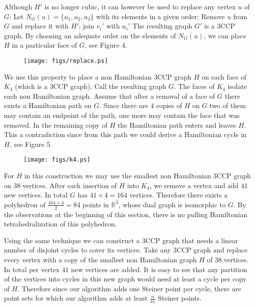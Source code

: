 \documentclass{article}
\begin{document}
Although $H'$ is no longer cubic, it can however be used to replace any vertex $u$ of $G$:
Let $N_G(u)=\{u_1, u_2, u_3\}$ with its elements in a given order; Remove $u$ from $G$ and replace it with $H'$;
join $v_i'$ with  $u_i'$
The resulting graph $G'$ is a $3$CCP graph. By choosing an adequate order on the elements of $N_G(u)$, we can place $H$ in a particular face of $G$, see Figure 4. \par

\begin{figure}\label{fig:choice}
	\begin{center}
  		\texttt{[image: figs/replace.ps]}
	\end{center}
	\caption{}
\end{figure}

We use this property to place a non Hamiltonian $3$CCP graph $H$ on each face of $K_4$ (which is
a $3$CCP graph). Call the resulting graph $G$.
The faces of $K_4$ isolate each non Hamiltonian graph. 
Assume that after a removal of a face of $G$ there exists a Hamiltonian path on $G$. 
Since there are $4$ copies of $H$ on $G$
two of them may contain an endpoint of the path, one more may contain the face that was removed.
In the remaining copy of $H$ the Hamiltonian path enters and leaves $H$. This a contradiction 
since from this path we could derive a Hamiltonian cycle in $H$, see Figure 5.\par

\begin{figure}\label{fig:k4}
	\begin{center}
  		\texttt{[image: figs/k4.ps]}
	\end{center}
	\caption{}
\end{figure}


For $H$ in this construction we may use the smallest non Hamiltonian $3$CCP graph on $38$ vertices.
After each insertion of $H$ into $K_4$, we remove a vertex  and add $41$ new vertices.
 In total $G$ has $41 \times 4=164$
vertices. Therefore there exists a polyhedron of $\frac{164+4}{2}=84$ points in $\mathbb{R}^3$, whose dual graph is isomorphic to $G$. By the observations at the beginning of this section, there is no pulling Hamiltonian tetrahedralization of this polyhedron.\par

Using the same technique we can construct a $3$CCP graph that needs a linear number of disjoint cycles to cover its vertices. Take any $3$CCP graph and replace every vertex with a copy of the smallest
non Hamiltonian graph $H$ of $38$ vertices. In total per vertex $41$ new vertices are added. It is easy to see that any partition of the vertices into cycles in this new graph would need at least a cycle per
 copy of $H$. Therefore since our algorithm adds one Steiner point per cycle, there  are point sets
for which our algorithm adds at least $\frac{n}{41}$ Steiner points.\par
\end{document}
